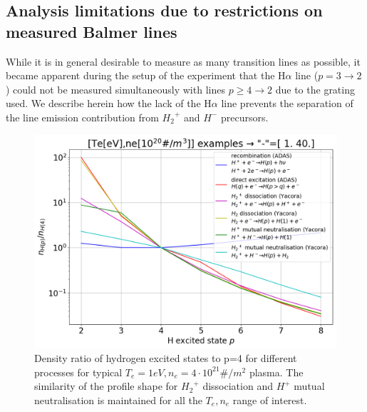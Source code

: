 \subsection{Analysis limitations due to restrictions on measured Balmer lines}\label{Limitations due to the measured lines}
While it is in general desirable to measure as many transition lines as possible, it became apparent during the setup of the experiment that the H$\alpha$ line ($p=3\rightarrow 2$) could not be measured simultaneously with lines $p\geq 4\rightarrow 2$ due to the grating used. We describe herein how the lack of the H$\alpha$ line prevents the separation of the line emission contribution from ${H_2}^+$ and ${H^-}$ precursors.

\begin{figure}[!ht]
	\centering
	\includegraphics[width=0.7\linewidth,trim={0 0 0 36},clip]{Chapters/chapter3/figs/pure_rates_compare.png}
	\caption{Density ratio of hydrogen excited states to p=4 for different processes for typical $T_e=1eV,n_e=4 \cdot 10^{21}\#/m^2$ plasma. The similarity of the profile shape for ${H_2}^+$ dissociation and $H^+$ mutual neutralisation is maintained for all the $T_e,n_e$ range of interest.}
	\label{fig:lines1}
\end{figure}


